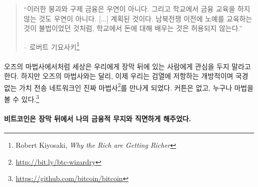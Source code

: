 \begin{quotation}\begin{samepage}
		\enquote{이러한 붕괴와 구제 금융은 우연이 아니다. 그리고 학교에서 금융 교육을 하지 않는 것도 우연이 아니다. [...] 계획된 것이다.
			남북전쟁 이전에 노예를 교육하는 것이 불법이었던 것처럼, 학교에서 돈에 대해 배우는 것은 허용되지 않는다.}
		\begin{flushright} -- 로버트 기요사키\footnote{Robert Kiyosaki, \textit{Why the Rich
					are Getting Richer}\cite{robert-kiyosaki}}
\end{flushright}\end{samepage}\end{quotation}

\paragraph{}
오즈의 마법사에서처럼 세상은 우리에게 장막 뒤에 있는 사람에게 관심을 두지 말라고 한다.
하지만 오즈의 마법사와는 달리, 이제 우리는 검열에 저항하는 개방적이며 국경 없는 가치 전송 네트워크인 진짜 마법사\footnote{\url{http://bit.ly/btc-wizardry}}를 만나게 되었다.
커튼은 없고, 누구나 마법을 볼 수 있다.\footnote{\url{https://github.com/bitcoin/bitcoin}}

\paragraph{비트코인은 장막 뒤에서 나의 금융적 무지와 직면하게 해주었다.}

%
%
%
%
